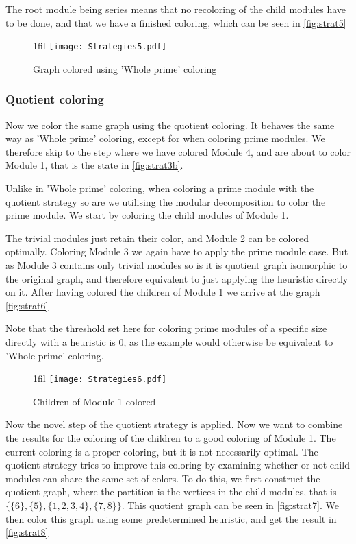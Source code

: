 \documentclass[a4paper]{article}
\makeatletter
\newcommand*{\centerfloat}{%
  \parindent \z@
  \leftskip \z@ \@plus 1fil \@minus \textwidth
  \rightskip\leftskip
  \parfillskip \z@skip}
\makeatother
\begin{document}
The root
module being series means that no recoloring of the child modules have to
be done, and that we have a finished coloring, which can be seen in
\autoref{fig:strat5}
\begin{figure}[H]
    \centerfloat
    \texttt{[image: Strategies5.pdf]}
    \caption{Graph colored using 'Whole prime' coloring}
    \label{fig:strat5}
\end{figure}
\FloatBarrier

\subsubsection{Quotient coloring}
Now we color the same graph using the quotient coloring. It behaves the same way
as 'Whole prime' coloring, except for when coloring prime modules. We therefore
skip to the step where we have colored Module 4, and are about to color 
Module 1, that is the state in \autoref{fig:strat3b}.

Unlike in 'Whole prime' coloring, when coloring a prime module with the quotient
strategy so are we utilising the modular decomposition to color the prime
module. We start by coloring the child modules of Module 1.

The trivial modules just retain their color, and Module 2 can be colored
optimally. Coloring Module 3 we again have to apply the prime module case. But as
Module 3 contains only trivial modules so is it is quotient graph isomorphic to
the original graph, and therefore equivalent to just applying the heuristic
directly on it. After having colored the children of Module 1 we arrive at the
graph \autoref{fig:strat6}

Note that the threshold set here for coloring prime modules of a specific size
directly with a heuristic is 0, as the example would otherwise be equivalent to
'Whole prime' coloring. 

\begin{figure}[H]
    \centerfloat
    \texttt{[image: Strategies6.pdf]}
    \caption{Children of Module 1 colored}
    \label{fig:strat6}
\end{figure}

Now the novel step of the quotient strategy is applied. Now we want to combine
the results for the coloring of the children to a good coloring of Module 1.
The current coloring is a proper coloring, but it is not necessarily optimal. The
quotient strategy tries to improve this coloring by examining whether or not
child modules can share the same set of colors. To do this, we first construct
the quotient graph, where the partition is the vertices in the child modules,
that is $\{\{6\},\{5\},\{1,2,3,4\},\{7,8\}\}$. This quotient graph can be seen
in \autoref{fig:strat7}. We then color this graph using some predetermined
heuristic, and get the result in \autoref{fig:strat8}
\end{document}
